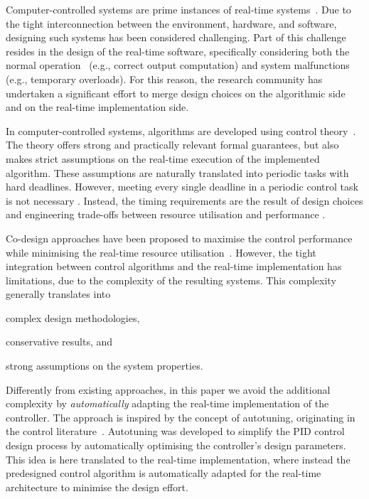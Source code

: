 Computer-controlled systems are prime instances of real-time systems~\cite{Oshana:2006, akesson:2020}.
Due to the tight interconnection between the environment, hardware, and software, designing such systems has been considered challenging.
Part of this challenge resides in the design of the real-time software, specifically considering both the normal operation~\cite{Lozoya:2013,Aminifar:2011} (e.g., correct output computation) and system malfunctions~\cite{Caccamo:2002,Ramanathan:1997} (e.g., temporary overloads).
For this reason, the research community has undertaken a significant effort to merge design choices on the algorithmic side and on the real-time implementation side.

In computer-controlled systems, algorithms are developed using control theory~\cite{Astrom:2008}.
The theory offers strong and practically relevant formal guarantees, but also makes strict assumptions on the real-time execution of the implemented algorithm.
These assumptions are naturally translated into periodic tasks with hard deadlines.
However, meeting every single deadline in a periodic control task is not necessary \cite{Ramamritham:1996,Ramanathan:1997}.
Instead, the timing requirements are the result of design choices and engineering trade-offs between resource utilisation and performance \cite{Lozoya:2013,Cervin:2004}.

Co-design approaches have been proposed to maximise the control performance while minimising the real-time resource utilisation~\cite{Marti:2001,Rehbinder:2000}.
However, the tight integration between control algorithms and the real-time implementation has limitations, due to the complexity of the resulting systems.
This complexity generally translates into
\begin{enumerate*}[label=(\roman*)]
    \item complex design methodologies,
    \item conservative results, and
    \item strong assumptions on the system properties.
\end{enumerate*}

Differently from existing approaches, in this paper we avoid the additional complexity by \emph{automatically} adapting the real-time implementation of the controller.
The approach is inspired by the concept of autotuning, originating in the control literature~\cite{Astrom:1984, Hagglund:1983}.
Autotuning was developed to simplify the PID control design process by automatically optimising the controller's design parameters.
This idea is here translated to the real-time implementation, where instead the predesigned control algorithm is automatically adapted for the real-time architecture to minimise the design effort.

